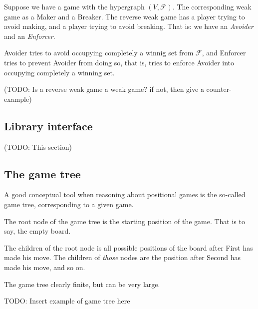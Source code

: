 Suppose we have a game with the hypergraph $(V,\mathcal F)$.
The corresponding weak game as a Maker and a Breaker.
The reverse weak game has a player trying to avoid making, and a player trying to avoid breaking.
That is: we have an \emph{Avoider} and an \emph{Enforcer}.

Avoider tries to avoid occupying completely a winnig set from $\mathcal F$, and Enforcer tries to prevent Avoider from doing so, that is, tries to enforce Avoider into occupying completely a winning set.

(TODO: Is a reverse weak game a weak game? if not, then give a counter-example)

\subsection{Library interface}

(TODO: This section)


\subsection{The game tree}

A good conceptual tool when reasoning about positional games is the so-called game tree, corresponding to a given game.

The root node of the game tree is the starting position of the game.
That is to say, the empty board.

The children of the root node is all possible positions of the board after First has made his move.
The children of \emph{those} nodes are the position after Second has made his move, and so on.

The game tree clearly finite, but can be very large.

TODO: Insert example of game tree here
